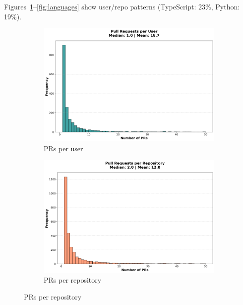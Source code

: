 \documentclass[11pt]{article}
\begin{document}
Figures~\ref{fig:prs_user}--\ref{fig:languages} show user/repo patterns (TypeScript: 23\%, Python: 19\%).

\begin{figure}[H]
\centering
\begin{subfigure}[b]{0.48\textwidth}
\centering
\includegraphics[width=\textwidth]{figures_individual/19_prs_per_user_histogram.png}
\caption{PRs per user}
\label{fig:prs_user}
\end{subfigure}
\hfill
\begin{subfigure}[b]{0.48\textwidth}
\centering
\includegraphics[width=\textwidth]{figures_individual/20_prs_per_repo_histogram.png}
\caption{PRs per repository}
\label{fig:prs_repo}
\end{subfigure}

\vspace{0.2cm}


\end{figure}
\end{document}
